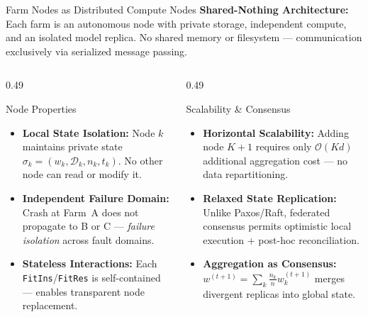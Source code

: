 \documentclass[aspectratio=169]{beamer}
\begin{document}
\begin{frame}{Farm Nodes as Distributed Compute Nodes}
    {\small \textbf{Shared-Nothing Architecture:} Each farm is an autonomous node with private storage, independent compute, and an isolated model replica. No shared memory or filesystem --- communication exclusively via serialized message passing.}
    \vspace{0.1cm}
    \begin{columns}[T]
        \begin{column}{0.49\textwidth}
            \begin{block}{Node Properties}
                \begin{itemize}\footnotesize
                    \item \textbf{Local State Isolation:} Node $k$ maintains private state $\sigma_k = (w_k, \mathcal{D}_k, n_k, t_k)$. No other node can read or modify it.
                    \item \textbf{Independent Failure Domain:} Crash at Farm~A does not propagate to B or C --- \textit{failure isolation} across fault domains.
                    \item \textbf{Stateless Interactions:} Each \texttt{FitIns}/\texttt{FitRes} is self-contained --- enables transparent node replacement.
                \end{itemize}
            \end{block}
        \end{column}
        \begin{column}{0.49\textwidth}
            \begin{block}{Scalability \& Consensus}
                \begin{itemize}\footnotesize
                    \item \textbf{Horizontal Scalability:} Adding node $K{+}1$ requires only $\mathcal{O}(Kd)$ additional aggregation cost --- no data repartitioning.
                    \item \textbf{Relaxed State Replication:} Unlike Paxos/Raft, federated consensus permits optimistic local execution + post-hoc reconciliation.
                    \item \textbf{Aggregation as Consensus:} $w^{(t+1)} = \sum_k \frac{n_k}{n} w_k^{(t+1)}$ merges divergent replicas into global state.
                \end{itemize}
            \end{block}
        \end{column}
    \end{columns}
\end{frame}
\end{document}
